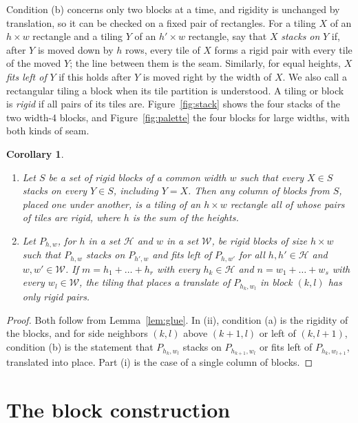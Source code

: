\documentclass[11pt]{article}
\newtheorem{corollary}[theorem]{Corollary}
\theoremstyle{definition}
\theoremstyle{remark}
\begin{document}
Condition (b) concerns only two blocks at a time, and rigidity is unchanged
by translation, so it can be checked on a fixed pair of rectangles. For a
tiling $X$ of an $h\times w$ rectangle and a tiling $Y$ of an $h'\times w$
rectangle, say that $X$ \emph{stacks on} $Y$ if, after $Y$ is moved down by
$h$ rows, every tile of $X$ forms a rigid pair with every tile of the moved
$Y$; the line between them is the seam. Similarly, for equal heights, $X$
\emph{fits left of} $Y$ if this holds after $Y$ is moved right by the width
of $X$. We also call a rectangular tiling a block when its tile partition is
understood. A tiling or block is \emph{rigid} if all pairs of its tiles are.
Figure~\ref{fig:stack} shows the four stacks of the two width-4 blocks, and
Figure~\ref{fig:palette} the four blocks for large widths, with both kinds of
seam.

\begin{corollary}\label{cor:assemble}
\begin{enumerate}
\item[(i)] Let $S$ be a set of rigid blocks of a common width $w$ such that
every $X\in S$ stacks on every $Y\in S$, including $Y=X$. Then any column of
blocks from $S$, placed one under another, is a tiling of an $h\times w$
rectangle all of whose pairs of tiles are rigid, where $h$ is the sum of the
heights.
\item[(ii)] Let $P_{h,w}$, for $h$ in a set $\mathcal H$ and $w$ in a set
$\mathcal W$, be rigid blocks of size $h\times w$ such that $P_{h,w}$ stacks
on $P_{h',w}$ and fits left of $P_{h,w'}$ for all $h,h'\in\mathcal H$ and
$w,w'\in\mathcal W$. If $m=h_1+\dots+h_r$ with every $h_k\in\mathcal H$ and
$n=w_1+\dots+w_s$ with every $w_l\in\mathcal W$, the tiling that places a
translate of $P_{h_k,w_l}$ in block $(k,l)$ has only rigid pairs.
\end{enumerate}
\end{corollary}

\begin{proof}
Both follow from Lemma~\ref{lem:glue}. In (ii), condition (a) is the rigidity of the
blocks, and for side neighbors $(k,l)$ above $(k+1,l)$ or left of $(k,l+1)$,
condition (b) is the statement that $P_{h_k,w_l}$ stacks on
$P_{h_{k+1},w_l}$ or fits left of $P_{h_k,w_{l+1}}$, translated into place.
Part (i) is the case of a single column of blocks.
\end{proof}

\section{The block construction}\label{sec:blocks}
\end{document}
